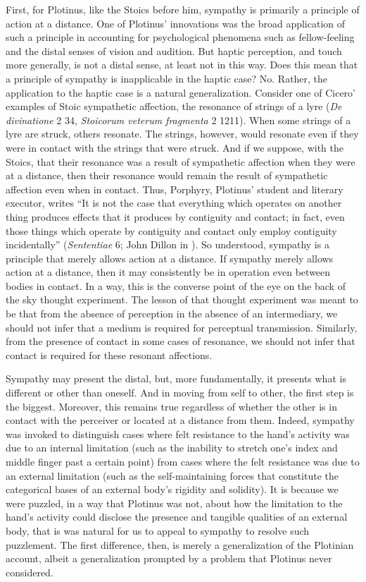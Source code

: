 First, for Plotinus, like the Stoics before him, sympathy is primarily a principle of action at a distance. One of Plotinus' innovations was the broad application of such a principle in accounting for psychological phenomena such as fellow-feeling and the distal senses of vision and audition. But haptic perception, and touch more generally, is not a distal sense, at least not in this way. Does this mean that a principle of sympathy is inapplicable in the haptic case? No. Rather, the application to the haptic case is a natural generalization. Consider one of Cicero' examples of Stoic sympathetic affection, the resonance of strings of a lyre (\emph{De divinatione} 2 34, \emph{Stoicorum veterum fragmenta} 2 1211). When some strings of a lyre are struck, others resonate. The strings, however, would resonate even if they were in contact with the strings that were struck. And if we suppose, with the Stoics, that their resonance was a result of sympathetic affection when they were at a distance, then their resonance would remain the result of sympathetic affection even when in contact. Thus, Porphyry, Plotinus' student and literary executor, writes ``It is not the case that everything which operates on another thing produces effects that it produces by contiguity and contact; in fact, even those things which operate by contiguity and contact only employ contiguity incidentally'' (\emph{Sententiae} 6; John Dillon in \citealt[796]{Brisson:2005qr}). So understood, sympathy is a principle that merely allows action at a distance. If sympathy merely allows action at a distance, then it may consistently be in operation even between bodies in contact. In a way, this is the converse point of the eye on the back of the sky thought experiment. The lesson of that thought experiment was meant to be that from the absence of perception in the absence of an intermediary, we should not infer that a medium is required for perceptual transmission. Similarly, from the presence of contact in some cases of resonance, we should not infer that contact is required for these resonant affections.

Sympathy may present the distal, but, more fundamentally, it presents what is different or other than oneself. And in moving from self to other, the first step is the biggest. Moreover, this remains true regardless of whether the other is in contact with the perceiver or located at a distance from them. Indeed, sympathy was invoked to distinguish cases where felt resistance to the hand's activity was due to an internal limitation (such as the inability to stretch one's index and middle finger past a certain point) from cases where the felt resistance was due to an external limitation (such as the self-maintaining forces that constitute the categorical bases of an external body's rigidity and solidity). It is because we were puzzled, in a way that Plotinus was not, about how the limitation to the hand's activity could disclose the presence and tangible qualities of an external body, that is was natural for us to appeal to sympathy to resolve such puzzlement. The first difference, then, is merely a generalization of the Plotinian account, albeit a generalization prompted by a problem that Plotinus never considered.

